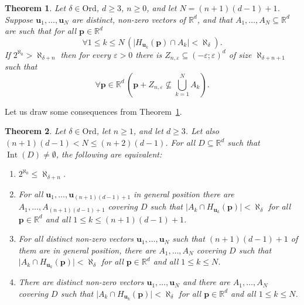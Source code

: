 \documentclass[12pt]{amsart}
\DeclareMathOperator{\Int}{Int} 		%
\newcommand{\FORALL}[1]{\forall {#1} \, }
\newcommand{\R}{\mathbb{R}}	%
\newcommand{\card}[1]{\mathopen | #1 \mathclose |}		%
\newcommand{\On}{\mathord{\mathrm{Ord}}}		%
\theoremstyle{plain}
\newtheorem{theorem}{Theorem}[section]
\theoremstyle{definition}
\theoremstyle{remark}
\begin{document}
\begin{theorem}\label{th:hyperplanes=>bound}
Let \( \delta \in \On \), \( d \geq 3 \), \( n \geq 0 \), and let \( N = ( n + 1 ) ( d - 1 ) + 1 \).
Suppose \( \mathbf{u}_1 , \dots , \mathbf{u}_N \) are distinct, non-zero vectors of \( \R^d \), and that \( A_1 , \dots , A_ N \subseteq \R^d \) are such that for all \( \mathbf{p} \in \R^d \)
\[
 \FORALL{ 1 \leq k \leq N} \left ( \card{ H_{\mathbf{u}_k } ( \mathbf{p} ) \cap A_k } < \aleph_ \delta \right ) .
\]
If \( 2^{\aleph_0} > \aleph_{ \delta + n } \) then for every \( \varepsilon > 0 \) there is \( Z_{ n , \varepsilon } \subseteq ( - \varepsilon ; \varepsilon )^d \) of size \( \aleph_{ \delta + n + 1} \) such that 
\[ 
 \FORALL{ \mathbf{p} \in \R^d } \left ( \mathbf{p} + Z_{ n , \varepsilon } \nsubseteq \textstyle \bigcup_{ k = 1 }^N A_k \right ) . 
\]
\end{theorem}

Let us draw some consequences from Theorem~\ref{th:hyperplanes=>bound}.

\begin{theorem}\label{th:hyperplanes<=>bound}
Let \( \delta \in \On \), let \( n \geq 1 \), and let \( d \geq 3 \).
Let also \( ( n + 1 ) ( d - 1 ) < N \leq ( n + 2 ) ( d - 1 ) \).
For all \( D \subseteq \R^d \) such that \( \Int ( D ) \neq \emptyset \), the following are equivalent:
\begin{enumerate}[label={\upshape (\alph*)}]
\item\label{th:hyperplanes<=>bound-a}
\( 2^{\aleph_0 } \leq \aleph_{ \delta + n } \).
\item\label{th:hyperplanes<=>bound-b}
For all \( \mathbf{u}_1 , \dots , \mathbf{u}_{ ( n + 1 ) ( d - 1 ) + 1 } \) in general position there are \( A_1 , \dots , A_{ ( n + 1 ) ( d - 1 ) + 1 } \) covering \( D \) such that \( \card{ A_k \cap H_{ \mathbf{u}_k } ( \mathbf{p} ) } < \aleph_ \delta \) for all \( \mathbf{p} \in \R^d \) and all \( 1 \leq k \leq ( n + 1 ) ( d - 1 ) + 1 \).
\item\label{th:hyperplanes<=>bound-c}
For all distinct non-zero vectors \( \mathbf{u}_1 , \dots , \mathbf{u}_N \) such that \( ( n + 1 ) ( d - 1 ) + 1 \) of them are in general position, there are \( A_1 , \dots , A_N \) covering \( D \) such that \( \card{ A_k \cap H_{ \mathbf{u}_k } ( \mathbf{p} ) } < \aleph_ \delta \) for all \( \mathbf{p} \in \R^d \) and all \( 1 \leq k \leq N \).
\item\label{th:hyperplanes<=>bound-d}
There are distinct non-zero vectors \( \mathbf{u}_1 , \dots , \mathbf{u}_N \) and there are \( A_1 , \dots , A_N \) covering \( D \) such that \( \card{ A_k \cap H_{ \mathbf{u}_k } ( \mathbf{p} ) } < \aleph_ \delta \) for all \( \mathbf{p} \in \R^d \) and all \( 1 \leq k \leq N \).
\end{enumerate}
\end{theorem}
\end{document}
